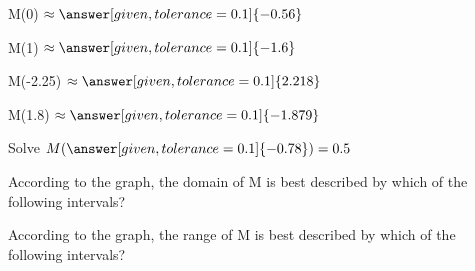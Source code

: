 \documentclass{ximera}
\begin{document}
\begin{exercise}
M(0)   $\approx \answer[given,tolerance=0.1]{-0.56}$
\end{exercise}


\begin{exercise}
M(1)   $\approx \answer[given,tolerance=0.1]{-1.6}$
\end{exercise}


\begin{exercise}
M(-2.25)   $\approx \answer[given,tolerance=0.1]{2.218}$
\end{exercise}


\begin{exercise}
M(1.8)   $\approx \answer[given,tolerance=0.1]{-1.879}$
\end{exercise}


\begin{exercise}
Solve   $ M( \answer[given,tolerance=0.1]{-0.78} ) = 0.5$
\end{exercise}







\begin{exercise}
According to the graph, the domain of M is best described by which of the following intervals?
\begin{multipleChoice}
\choice{$[-4, 3]$}
\choice[correct]{$[-4, 3)$}
\choice{$(-4, 3]$}
\end{multipleChoice}
\end{exercise}

\begin{exercise}
According to the graph, the range of M is best described by which of the following intervals?
\begin{multipleChoice}
\choice{$[2.5, -1.9]$}
\choice[correct]{$[-1.9, 2.5]$}
\end{multipleChoice}
\end{exercise}
\end{document}
